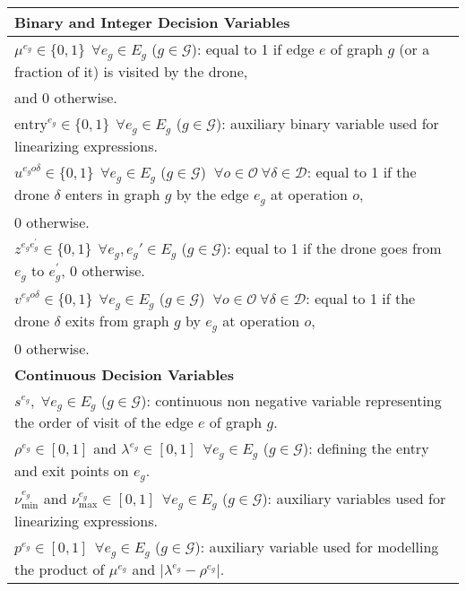 \begin{table}[h!]
\scriptsize
\centering
\begin{tabular}{|l|}
\hline 
\textbf{Binary and Integer Decision Variables}\\
\hline
$\mu^{e_g} \in \{0,1\} \:\: \forall e_g \in E_g$ ($g \in \mathcal{G}$): equal to 1 if edge $e$ of graph $g$ (or a fraction of it) is visited by the drone,\\ \hspace*{1cm} and  0 otherwise.\\
$\text{entry}^{e_g} \in \{0,1\} \:\: \forall e_g \in E_g$ ($g \in \mathcal{G}$): auxiliary binary variable used for linearizing expressions.\\
$u^{e_{g}o\delta} \in \{0,1\} \:\: \forall e_g \in E_g$ ($g \in \mathcal{G}$) $\: \forall o \in \mathcal O \: \forall \delta \in \mathcal D$: equal to 1 if the drone $\delta$ enters in graph $g$ by the edge $e_g$ at operation $o$,\\ \hspace*{1cm} 0 otherwise.\\
$z^{e_{g}e^{'}_{g}} \in \{0,1\} \:\: \forall e_g, e_g' \in E_g$ ($g \in \mathcal{G}$): equal to 1 if the drone goes from $e_g$ to $e^{'}_{g}$, 0 otherwise.\\
$v^{e_{g}o\delta} \in \{0,1\} \:\: \forall e_g \in E_g$ ($g \in \mathcal{G}$) $\: \forall o \in \mathcal O \: \forall \delta \in \mathcal D$: equal to 1 if the drone $\delta$ exits from graph $g$ by $e_g$ at operation $o$,\\ \hspace*{1cm} 0 otherwise.\\
\hline
\textbf{Continuous Decision Variables}\\
\hline
$s^{e_g},\; \forall e_g \in E_g$ ($g \in \mathcal{G}$): continuous non negative variable representing the order of visit of the edge $e$ of graph $g$.\\
$\rho^{e_g} \in [0,1]$ and $\lambda^{e_g} \in [0,1] \:\: \forall e_g \in E_g$ ($g \in \mathcal{G}$): defining the entry and exit points on $e_g$.\\
$\nu_\text{min}^{e_g}$ and $\nu_\text{max}^{e_g} \in [0,1] \:\: \forall e_g \in E_g$ ($g \in \mathcal{G}$): auxiliary variables used for linearizing expressions.\\
$p^{e_g}\in [0, 1] \:\: \forall e_g \in E_g$ ($g \in \mathcal G$): auxiliary variable used for modelling the product of $\mu^{e_g}$ and $|\lambda^{e_g}-\rho^{e_g}|$.\\

\end{tabular}
\end{table}
